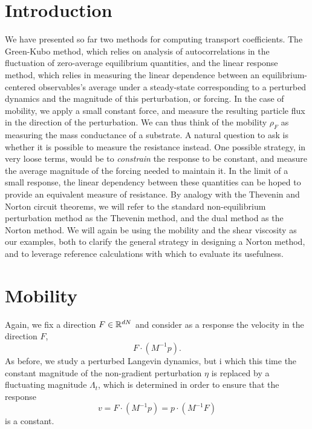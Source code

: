 \section{Introduction}
We have presented so far two methods for computing transport coefficients. The Green-Kubo method, which relies on analysis of autocorrelations in the fluctuation of zero-average equilibrium quantities, 
and the linear response method, which relies in measuring the linear dependence between an equilibrium-centered observables's average under a steady-state corresponding to a perturbed dynamics and the magnitude of this perturbation, or forcing.
In the case of mobility, we apply a small constant force, and measure the resulting particle flux in the direction of the perturbation. We can thus think of the mobility $\rho_F$ as measuring the mass conductance of a substrate.
A natural question to ask is whether it is possible to measure the resistance instead. One possible strategy, in very loose terms, would be to \textit{constrain} the response to be constant, and measure the average magnitude of the forcing needed to maintain it.
In the limit of a small response, the linear dependency between these quantities can be hoped to provide an equivalent measure of resistance. By analogy with the Thevenin and Norton circuit theorems, we will refer to the standard non-equilibrium perturbation method as the Thevenin method,
and the dual method as the Norton method. We will again be using the mobility and the shear viscosity as our examples, both to clarify the general strategy in designing a Norton method, and to leverage reference calculations with which to evaluate its usefulness. 

\section{Mobility}
Again, we fix a direction $F\in \mathbb{R}^{dN}$ and consider as a response the velocity in the direction $F$, \[F\cdot \left(M^{-1} p\right).\]
As before, we study a perturbed Langevin dynamics, but i which this time the constant magnitude of the non-gradient perturbation $\eta$ is replaced by a fluctuating magnitude $\Lambda_t$, which is determined in order to ensure that the response
\[v=F\cdot\left(M^{-1}p\right)=p\cdot\left(M^{-1}F\right)\]
is a constant.


